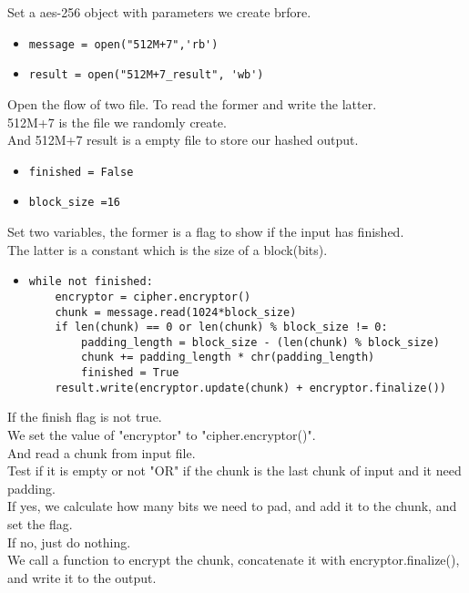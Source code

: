 \documentclass{article}
\begin{document}
\noindent Set a aes-256 object with parameters we create brfore.

\begin{itemize}
\item \verb|message = open("512M+7",'rb')|
\item \verb|result = open("512M+7_result", 'wb')|
\end{itemize}
 
\noindent Open the flow of two file. To read the former and write the latter.\\
512M+7 is the file we randomly create.\\
And 512M+7 result is a empty file to store our hashed output.

\begin{itemize}
\item \verb|finished = False|
\item \verb|block_size =16|
\end{itemize}

\noindent Set two variables, the former is a flag to show if the input has finished.\\
The latter is a constant which is the size of a block(bits).

\begin{itemize}
\item \begin{verbatim}while not finished:
    encryptor = cipher.encryptor()
    chunk = message.read(1024*block_size)
    if len(chunk) == 0 or len(chunk) % block_size != 0:
        padding_length = block_size - (len(chunk) % block_size)
        chunk += padding_length * chr(padding_length)
        finished = True
    result.write(encryptor.update(chunk) + encryptor.finalize())
\end{verbatim}
\end{itemize}

\noindent If the finish flag is not true.\\
We set the value of "encryptor" to "cipher.encryptor()".\\
And read a chunk from input file.\\
Test if it is empty or not "OR" if the chunk is the last chunk of input and it need padding.\\
If yes, we calculate how many bits we need to pad, and add it to the chunk, and set the flag.\\
If no, just do nothing.\\
We call a function to encrypt the chunk, concatenate it with encryptor.finalize(), and write it to the output.
\end{document}
